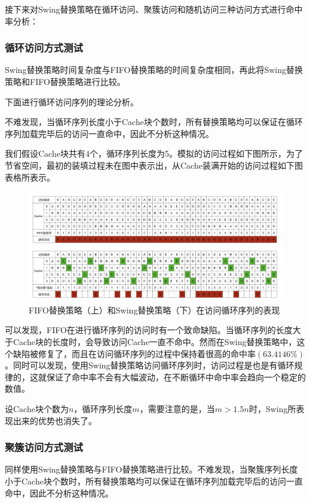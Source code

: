 \documentclass{article}
\begin{document}
接下来对Swing替换策略在循环访问、聚簇访问和随机访问三种访问方式进行命中率分析：

\subsubsection{循环访问方式测试}

Swing替换策略时间复杂度与FIFO替换策略的时间复杂度相同，再此将Swing替换策略和FIFO替换策略进行比较。

下面进行循环访问序列的理论分析。

不难发现，当循环序列长度小于Cache块个数时，所有替换策略均可以保证在循环序列加载完毕后的访问一直命中，因此不分析这种情况。

我们假设Cache块共有4个，循环序列长度为5。模拟的访问过程如下图所示，为了节省空间，最初的装填过程未在图中表示出，从Cache装满开始的访问过程如下图表格所表示。

\begin{figure}[H]
    \centering
    \includegraphics[width=1\textwidth]{pic2.png}
    \caption{FIFO替换策略（上）和Swing替换策略（下）在访问循环序列的表现}
\end{figure}

可以发现，FIFO在进行循环序列的访问时有一个致命缺陷。当循环序列的长度大于Cache块的长度时，会导致访问Cache一直不命中。然而在Swing替换策略中，这个缺陷被修复了，而且在访问循环序列的过程中保持着很高的命中率$(63.4146\%)$。同时可以发现，使用Swing替换策略访问循环序列时，访问过程是也是有循环规律的，这就保证了命中率不会有大幅波动，在不断循环中命中率会趋向一个稳定的数值。

设Cache块个数为$n$，循环序列长度$m$，需要注意的是，当$m>1.5n$时，Swing所表现出来的优势也消失了。

\subsubsection{聚簇访问方式测试}

同样使用Swing替换策略与FIFO替换策略进行比较。不难发现，当聚簇序列长度小于Cache块个数时，所有替换策略均可以保证在循环序列加载完毕后的访问一直命中，因此不分析这种情况。
\end{document}
